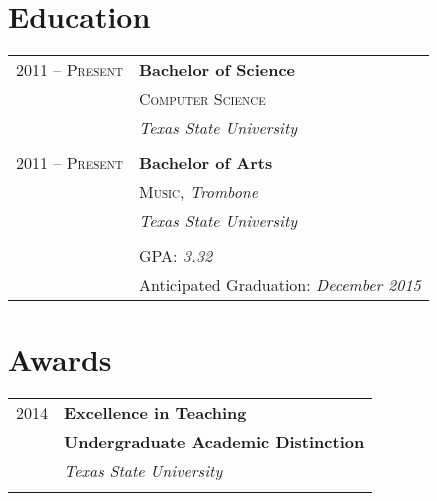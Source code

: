 \documentclass[10pt]{article} %
\begin{document}
\begin{minipage}[t]{0.44\textwidth}

\section{Education} 

\begin{tabular}{rl} %


2011 -- \textsc{Present} & \textbf{Bachelor of Science} \\ 
& \textsc{Computer Science} \\ 
& \textit{Texas State University}\\
&\\
	 

2011 -- \textsc{Present} & \textbf{Bachelor of Arts} \\ 
& \textsc{Music}, \textit{Trombone}\\ 
& \textit{Texas State University}\\ \\

& \large GPA: \textit{3.32} \\
& Anticipated Graduation: \textit{December 2015}\\

\end{tabular}


\section{Awards} 

\begin{tabular}{rl}
2014	 & \textbf{Excellence in Teaching}\\
	 & \textbf{Undergraduate Academic Distinction}\\
& \textit{Texas State University}\\ \\


\end{tabular}
\end{minipage}
\end{document}
